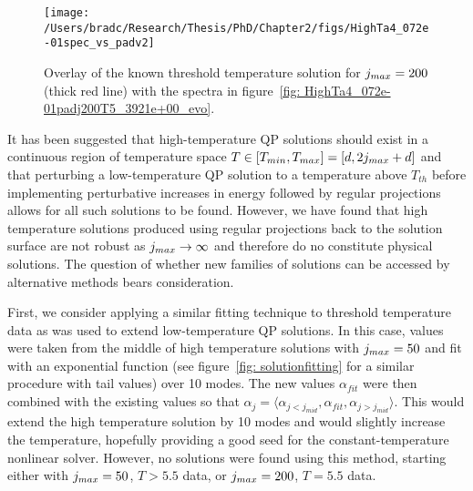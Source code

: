 \documentclass[../PhD.tex]{subfiles}
\begin{document}
\begin{figure}[ht]
	\centering
	\texttt{[image: /Users/bradc/Research/Thesis/PhD/Chapter2/figs/HighTa4\_072e-01spec\_vs\_padv2]}
	\caption[Comparison between a threshold temperature solution with $j_{max} = 200$ and the evolution of a $j_{max} = 100$ threshold temperature solution that has been padded by $100$ modes]{Overlay of the known threshold temperature solution for $j_{max} = 200$ (thick red line) with the spectra in figure~\ref{fig: HighTa4_072e-01padj200T5_3921e+00_evo}.}
	\label{fig: HighTa4_072e-01spec_vs_pad}
\end{figure}

It has been suggested that high-temperature QP solutions should exist in a continuous region of temperature space ${T \in [T_{min}, T_{max}] = [d, 2j_{max} + d]}$ and that perturbing a low-temperature QP solution to a temperature above $T_{th}$ before implementing perturbative increases in energy followed by regular projections allows for all such solutions to be found. However, we have found that high temperature solutions produced using regular projections back to the solution surface are not robust as $j_{max} \to \infty$ and therefore do no constitute physical solutions. The question of whether new families of solutions can be accessed by alternative methods bears consideration. 

First, we consider applying a similar fitting technique to threshold temperature data as was used to extend low-temperature QP solutions. In this case, values were taken from the middle of high temperature solutions with $j_{max} = 50$ and fit with an exponential function (see figure~\ref{fig: solutionfitting} for a similar procedure with tail values) over 10 modes. The new values $\alpha_{fit}$ were then combined with the existing values so that $\alpha_j = \langle \alpha_{j< j_{mid}}, \alpha_{fit}, \alpha_{j > j_{mid}} \rangle$. This would extend the high temperature solution by 10 modes and would slightly increase the temperature, hopefully providing a good seed for the constant-temperature nonlinear solver. However, no solutions were found using this method, starting either with $j_{max} = 50$, $T>5.5$ data, or $j_{max} = 200$, $T = 5.5$ data.
\end{document}
